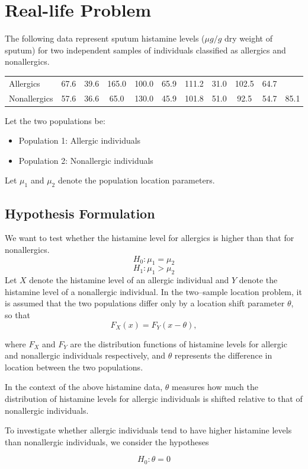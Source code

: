 \documentclass[10pt]{article}
\begin{document}
\section{Real-life Problem}
The following data represent sputum histamine levels ($\mu g/g$ dry weight of sputum) for two independent samples of individuals classified as allergics and nonallergics.
\begin{center}
\begin{tabular}{lcccccccccc}
\toprule
Allergics & 67.6 & 39.6 & 165.0 & 100.0 & 65.9 & 111.2 & 31.0 & 102.5 & 64.7 \\
Nonallergics & 57.6 & 36.6 & 65.0 & 130.0 & 45.9 & 101.8 & 51.0 & 92.5 & 54.7 & 85.1 \\
\bottomrule
\end{tabular}
\end{center}
Let the two populations be:
\begin{itemize}
\item Population 1: Allergic individuals
\item Population 2: Nonallergic individuals
\end{itemize}
Let $\mu_1$ and $\mu_2$ denote the population location parameters.
\subsection{Hypothesis Formulation}
We want to test whether the histamine level for allergics is higher than that for nonallergics.
\[
H_0 : \mu_1 = \mu_2
\]
\[
H_1 : \mu_1 > \mu_2
\]
Let $X$ denote the histamine level of an allergic individual and $Y$ denote the histamine level of a nonallergic individual. In the two–sample location problem, it is assumed that the two populations differ only by a location shift parameter $\theta$, so that
\[
F_X(x) = F_Y(x-\theta),
\]

where $F_X$ and $F_Y$ are the distribution functions of histamine levels for allergic and nonallergic individuals respectively, and $\theta$ represents the difference in location between the two populations.

In the context of the above histamine data, $\theta$ measures how much the distribution of histamine levels for allergic individuals is shifted relative to that of nonallergic individuals.

To investigate whether allergic individuals tend to have higher histamine levels than nonallergic individuals, we consider the hypotheses

\[
H_0 : \theta = 0
\]
\end{document}
